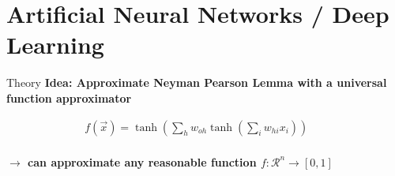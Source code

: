 \section[ann]{Artificial Neural Networks / Deep Learning}

\begin{frame}{Theory}
  \textbf{Idea: Approximate Neyman Pearson Lemma with a universal function approximator}

  \begin{center}
  \begin{align*}
    f(\vec{x}) = \tanh \left(\sum_h w_{oh} \tanh \left( \sum_i w_{hi} x_i \right) \right) & & \\
  \end{align*}

  \textbf{$\rightarrow$ can approximate any reasonable function $f: \mathcal{R}^n \rightarrow [0, 1]$}
  
\end{center}
\end{frame}

